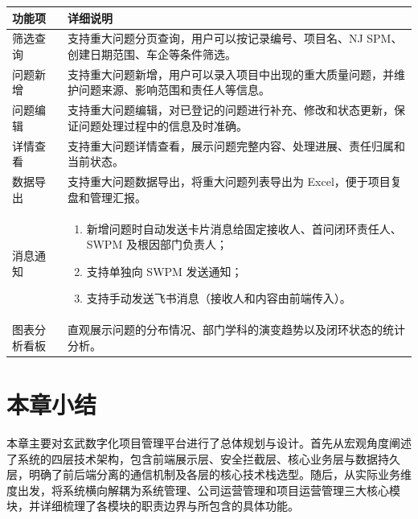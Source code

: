 \begin{enumerate}[label=(\arabic*)]
	\begin{center}
		\label{tab:serious_problem}
		{\songti{}\selectfont\fontsize{10.5pt}{12.6pt}\selectfont
			\begin{tabular}{p{3.5cm} p{10.5cm}}
				\toprule
				\textbf{功能项} & \textbf{详细说明} \\
				\midrule
				筛选查询 & 支持重大问题分页查询，用户可以按记录编号、项目名、NJ SPM、创建日期范围、车企等条件筛选。 \\
				问题新增 & 支持重大问题新增，用户可以录入项目中出现的重大质量问题，并维护问题来源、影响范围和责任人等信息。 \\
				问题编辑 & 支持重大问题编辑，对已登记的问题进行补充、修改和状态更新，保证问题处理过程中的信息及时准确。 \\
				详情查看 & 支持重大问题详情查看，展示问题完整内容、处理进展、责任归属和当前状态。 \\
				数据导出 & 支持重大问题数据导出，将重大问题列表导出为 Excel，便于项目复盘和管理汇报。 \\
				消息通知 & 
				\begin{enumerate}[nosep, leftmargin=*, label=\arabic*.]
					\item 新增问题时自动发送卡片消息给固定接收人、首问闭环责任人、SWPM 及根因部门负责人；
					\item 支持单独向 SWPM 发送通知；
					\item 支持手动发送飞书消息（接收人和内容由前端传入）。
				\end{enumerate} \\
				图表分析看板 & 直观展示问题的分布情况、部门学科的演变趋势以及闭环状态的统计分析。 \\
				\bottomrule
			\end{tabular}
		}
	\end{center}
	
\end{enumerate}

\section{本章小结}
本章主要对玄武数字化项目管理平台进行了总体规划与设计。首先从宏观角度阐述了系统的四层技术架构，包含前端展示层、安全拦截层、核心业务层与数据持久层，明确了前后端分离的通信机制及各层的核心技术栈选型。随后，从实际业务维度出发，将系统横向解耦为系统管理、公司运营管理和项目运营管理三大核心模块，并详细梳理了各模块的职责边界与所包含的具体功能。

